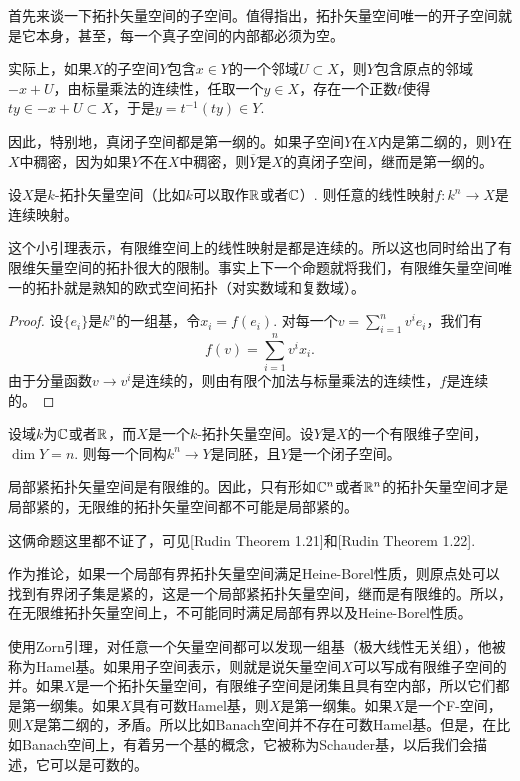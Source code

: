 \begin{para}\label{1.43}
	首先来谈一下拓扑矢量空间的子空间。值得指出，拓扑矢量空间唯一的开子空间就是它本身，甚至，每一个真子空间的内部都必须为空。

	实际上，如果$X$的子空间$Y$包含$x\in Y$的一个邻域$U\subset X$，则$Y$包含原点的邻域$-x+U$，由标量乘法的连续性，任取一个$y\in X$，存在一个正数$t$使得$ty\in -x+U\subset X$，于是$y=t^{-1}(ty)\in Y$.

	因此，特别地，真闭子空间都是第一纲的。如果子空间$Y$在$X$内是第二纲的，则$Y$在$X$中稠密，因为如果$Y$不在$X$中稠密，则$\overline{Y}$是$X$的真闭子空间，继而是第一纲的。
\end{para}

\begin{lem}
设$X$是$k$-拓扑矢量空间（比如$k$可以取作$\mathbb{R}$或者$\mathbb{C}$）. 则任意的线性映射$f:k^n\to X$是连续映射。
\end{lem}

这个小引理表示，有限维空间上的线性映射是都是连续的。所以这也同时给出了有限维矢量空间的拓扑很大的限制。事实上下一个命题就将我们，有限维矢量空间唯一的拓扑就是熟知的欧式空间拓扑（对实数域和复数域）。

\begin{proof}
设$\{e_i\}$是$k^n$的一组基，令$x_i=f(e_i)$. 对每一个$v=\sum_{i=1}^nv^ie_i$，我们有
\[
	f(v)=\sum_{i=1}^nv^ix_i.
\]
由于分量函数$v\to v^i$是连续的，则由有限个加法与标量乘法的连续性，$f$是连续的。
\end{proof}

\begin{pro}
	设域$k$为$\mathbb{C}$或者$\mathbb{R}$，而$X$是一个$k$-拓扑矢量空间。设$Y$是$X$的一个有限维子空间，$\dim Y=n$. 则每一个同构$k^n\to Y$是同胚，且$Y$是一个闭子空间。
\end{pro}

\begin{pro}\label{1.46}
局部紧拓扑矢量空间是有限维的。因此，只有形如$\mathbb{C}^n$或者$\mathbb{R}^n$的拓扑矢量空间才是局部紧的，无限维的拓扑矢量空间都不可能是局部紧的。
\end{pro}

这俩命题这里都不证了，可见[Rudin Theorem 1.21]和[Rudin Theorem 1.22].

作为推论，如果一个局部有界拓扑矢量空间满足Heine-Borel性质，则原点处可以找到有界闭子集是紧的，这是一个局部紧拓扑矢量空间，继而是有限维的。所以，在无限维拓扑矢量空间上，不可能同时满足局部有界以及Heine-Borel性质。

使用Zorn引理，对任意一个矢量空间都可以发现一组基（极大线性无关组），他被称为Hamel基。如果用子空间表示，则就是说矢量空间$X$可以写成有限维子空间的并。如果$X$是一个拓扑矢量空间，有限维子空间是闭集且具有空内部，所以它们都是第一纲集。如果$X$具有可数Hamel基，则$X$是第一纲集。如果$X$是一个F-空间，则$X$是第二纲的，矛盾。所以比如Banach空间并不存在可数Hamel基。但是，在比如Banach空间上，有着另一个基的概念，它被称为Schauder基，以后我们会描述，它可以是可数的。

